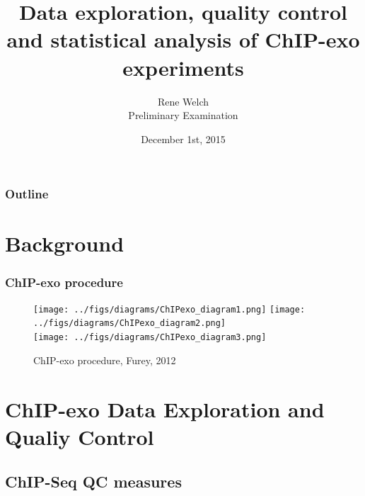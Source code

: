 \documentclass[compress,table,xcolor=dvipsnames]{beamer}\usepackage[]{graphicx}\usepackage[]{color}
\title[QC and analysis of ChIP-exo]{Data exploration, quality control
  and statistical analysis of ChIP-exo experiments}
\author{Rene Welch\\Preliminary Examination}
\institute[UW-STAT]{Department of Statistics\\University of Wisconsin - Madison}
\date{December 1st, 2015}
\begin{document}
\begin{frame}
  \maketitle
\end{frame}

\begin{frame}
\frametitle{Outline}
  \tableofcontents
\end{frame}

\section{Background}

\begin{frame}
\frametitle{ChIP-exo procedure}
  \begin{figure}[H]
    \centering
\texttt{[image: ../figs/diagrams/ChIPexo\_diagram1.png]}
\texttt{[image: ../figs/diagrams/ChIPexo\_diagram2.png]}\\
\texttt{[image: ../figs/diagrams/ChIPexo\_diagram3.png]}
    \caption{ChIP-exo procedure, Furey, 2012 \cite{chipbeyond}}
    \label{fig:exo_diagram}
  \end{figure}
\end{frame}

\section{ChIP-exo Data Exploration and Qualiy Control}

\subsection{ChIP-Seq QC measures}
\end{document}
